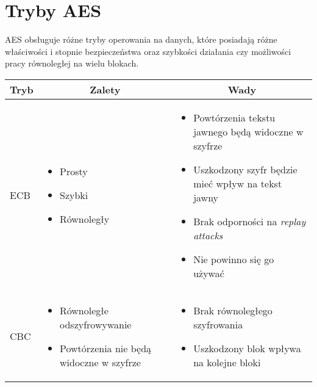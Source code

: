 \documentclass[a4paper,11pt]{article}
\theoremstyle{mytheor}
\begin{document}
\section*{Tryby AES}
AES obsługuje różne tryby operowania na danych, które posiadają różne właściwości i stopnie bezpieczeństwa oraz szybkości działania czy możliwości pracy równoległej na wielu blokach.

\begin{table}[H]
    \begin{tabular}{|p{}|p{}|p{}|}
        \hline
        \multicolumn{1}{|c}{\textbf{Tryb}} & \multicolumn{1}{|c|}{\textbf{Zalety}} & \multicolumn{1}{|c|}{\textbf{Wady}}
        \\ \hline
        ECB & \begin{itemize}
            \setlength\itemsep{-0.5em}
            \item Prosty
            \item Szybki
            \item Równoległy
        \end{itemize} & \begin{itemize}
            \setlength\itemsep{-0.8em}
            \item Powtórzenia tekstu jawnego będą widoczne w szyfrze
            \item Uszkodzony szyfr będzie mieć wpływ na tekst jawny
            \item Brak odporności na \textit{replay attacks}
            \item Nie powinno się go używać
        \end{itemize}
        \\ \hline

        CBC & \begin{itemize}
            \setlength\itemsep{-0.5em}
            \item Równoległe odszyfrowywanie
            \item Powtórzenia nie będą widoczne w szyfrze
        \end{itemize} & \begin{itemize}
            \setlength\itemsep{-0.8em}
            \item Brak równoległego szyfrowania
            \item Uszkodzony blok wpływa na kolejne bloki
        \end{itemize}
        \\ \hline


\end{tabular}
\end{table}
\end{document}
